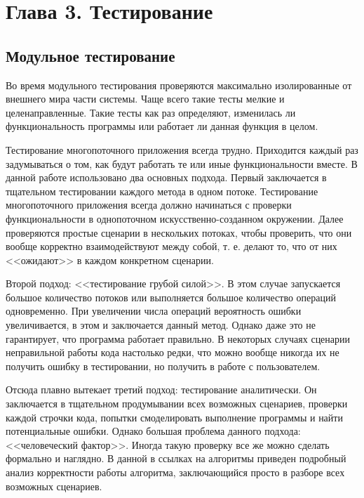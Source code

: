 \documentclass[12pt]{article}
\begin{document}
{		\newpage
		
		\section{Глава 3. Тестирование}
				\subsection{Модульное тестирование}
					\par Во время модульного тестирования проверяются максимально изолированные от внешнего мира части системы. Чаще всего такие тесты мелкие и целенаправленные. Такие тесты как раз определяют, изменилась ли функциональность программы или работает ли данная функция в целом.
					\par Тестирование многопоточного приложения всегда трудно. Приходится каждый раз задумываться о том, как будут работать те или иные функциональности вместе. В данной работе использовано два основных подхода. Первый заключается в тщательном тестировании каждого метода в одном потоке. Тестирование многопоточного приложения всегда должно начинаться с проверки функциональности в однопоточном искусственно-созданном окружении. Далее проверяются простые сценарии в нескольких потоках, чтобы проверить, что они вообще корректно взаимодействуют между собой, т. е. делают то, что от них <<ожидают>> в каждом конкретном сценарии.
					\par Второй подход: <<тестирование грубой силой>>. В этом случае запускается большое количество потоков или выполняется большое количество операций одновременно. При увеличении числа операций вероятность ошибки увеличивается, в этом и заключается данный метод. Однако даже это не гарантирует, что программа работает правильно. В некоторых случаях сценарии неправильной работы кода настолько редки, что можно вообще никогда их не получить ошибку в тестировании, но получить в работе с пользователем.
					\par Отсюда плавно вытекает третий подход: тестирование аналитически. Он заключается в тщательном продумывании всех возможных сценариев, проверки каждой строчки кода, попытки смоделировать выполнение программы и найти потенциальные ошибки. Однако большая проблема данного подхода: <<человеческий фактор>>. Иногда такую проверку все же можно сделать формально и наглядно. В данной в ссылках на алгоритмы приведен подробный анализ корректности работы алгоритма, заключающийся просто в разборе всех возможных сценариев.
}
\end{document}

